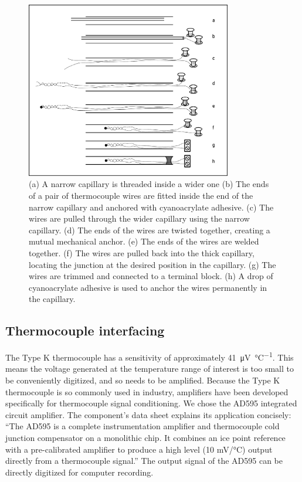 \begin{figure}
	\centering
	\includegraphics[width=0.8\textwidth]{Figures/FineWireThermocouple.pdf}
	\decoRule
	
\caption[A cartoon explaining how to construct a long, thin thermocouple
probe.]{(a) A narrow capillary is threaded inside a wider one (b) The ends of a
pair of thermocouple wires are fitted inside the end of the narrow capillary and
anchored with cyanoacrylate adhesive. (c) The wires are pulled through the
wider capillary using the narrow capillary. (d) The ends of the wires are twisted
together, creating a mutual mechanical anchor.
(e) The ends of the wires are welded together. (f) The wires are pulled back
into the thick capillary, locating the junction at the desired position in the
capillary. (g) The wires are trimmed and connected to a terminal block. (h) A
drop of cyanoacrylate adhesive is used to anchor the wires permanently in the
capillary. }
	
	\label{fig:FineWireThermocouple}
\end{figure}

\subsection{Thermocouple interfacing}

The Type K thermocouple has a sensitivity of approximately
\SI{41}{\micro\volt\per\celsius}. This means the voltage generated at the
temperature range of interest is too small to be conveniently digitized, and so
needs to be amplified. Because the Type K thermocouple is so commonly used in
industry, amplifiers have been developed specifically for thermocouple signal
conditioning. We chose the AD595 integrated circuit amplifier. The component's
data sheet explains its application concisely: ``The AD595 is a complete
instrumentation amplifier and thermocouple cold junction compensator on a
monolithic chip. It combines an ice point reference with a pre-calibrated
amplifier to produce a high level (10 mV/°C) output directly from a thermocouple
signal.'' \autocite{AD595} The output signal of the AD595 can be directly
digitized for computer recording.


